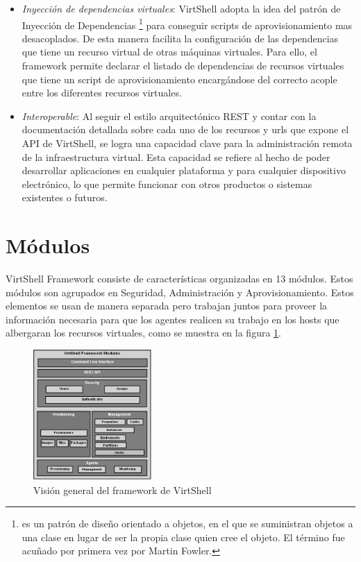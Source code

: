 \documentclass[conference, spanish]{IEEEtran}
\begin{document}
\begin{itemize}
\item \emph{Inyección de dependencias virtuales}: VirtShell adopta la idea del patrón de Inyección de Dependencias \footnote{es un patrón de diseño orientado a objetos, en el que se suministran objetos a una clase en lugar de ser la propia clase quien cree el objeto. El término fue acuñado por primera vez por Martin Fowler.} \cite{fowler04} para conseguir scripts de aprovisionamiento mas desacoplados. De esta manera facilita la configuración de las dependencias que tiene un recurso virtual de otras máquinas virtuales. Para ello, el framework permite declarar el listado de dependencias de recursos virtuales que tiene un script de aprovisionamiento encargándose del correcto acople entre los diferentes recursos virtuales.
\item \emph{Interoperable}: Al seguir el estilo arquitectónico REST y contar con la documentación detallada sobre cada uno de los recursos y urls que expone el API de VirtShell, se logra una capacidad clave para la administración remota de la infraestructura virtual. Esta capacidad se refiere al hecho de poder desarrollar aplicaciones en cualquier plataforma y para cualquier dispositivo electrónico, lo que permite funcionar con otros productos o sistemas existentes o futuros.

\end{itemize}

\section{Módulos}
VirtShell Framework consiste de características organizadas en 13 módulos. Estos módulos son agrupados en Seguridad, Administración y Aprovisionamiento. Estos elementos se usan de manera separada pero trabajan juntos para proveer la información necesaria para que los agentes realicen su trabajo en los hosts que albergaran los recursos virtuales, como se muestra en la figura \ref{fig:framework}. \\

\begin{figure}[h]
  \centering
  \includegraphics[width = 0.4\textwidth]{../architecture/v1/diagrams/framework}
  \caption{Visión general del framework de VirtShell}
  \label{fig:framework}
\end{figure}
\end{document}
